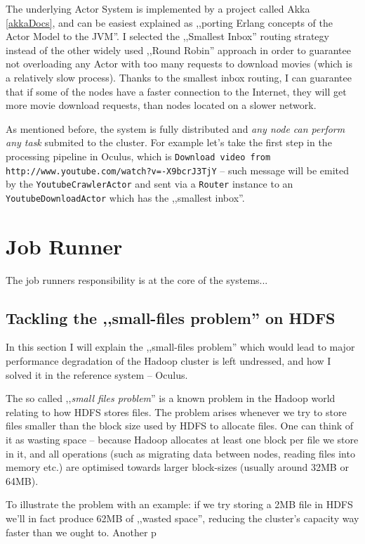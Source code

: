 The underlying Actor System is implemented by a project called Akka \ref{akkaDocs}, and can be easiest explained as ,,porting Erlang concepts of the Actor Model to the JVM''. I selected the ,,Smallest Inbox'' routing strategy instead of the other widely used ,,Round Robin'' approach in order to guarantee not overloading any Actor with too many requests to download movies (which is a relatively slow process). Thanks to the smallest inbox routing, I can guarantee that if some of the nodes have a faster connection to the Internet, they will get more movie download requests, than nodes located on a slower network.

As mentioned before, the system is fully distributed and \textit{any node can perform any task} submited to the cluster. For example let's take the first step in the processing pipeline in Oculus, which is \verb|Download video from http://www.youtube.com/watch?v=-X9bcrJ3TjY| -- such message will be emited by the \verb|YoutubeCrawlerActor| and sent via a \verb|Router| instance to an \verb|YoutubeDownloadActor| which has the ,,smallest inbox''.


\section{Job Runner}
The job runners responsibility is at the core of the systems... 

\subsection{Tackling the ,,small-files problem'' on HDFS}
In this section I will explain the ,,small-files problem'' which would lead to major performance degradation of the Hadoop cluster is left undressed, and how I solved it in the reference system -- Oculus.

The so called ,,\textit{small files problem}'' is a known problem in the Hadoop world relating to how HDFS stores files. 
The problem arises whenever we try to store files smaller than the block size used by HDFS to allocate files. One can think of it as wasting space -- because Hadoop allocates at least one block per file we store in it, and all operations (such as migrating data between nodes, reading files into memory etc.) are optimised towards larger block-sizes (usually around 32MB or 64MB). 

To illustrate the problem with an example: if we try storing a 2MB file in HDFS we'll in fact produce 62MB of ,,wasted space'', reducing the cluster's capacity way faster than we ought to. Another p